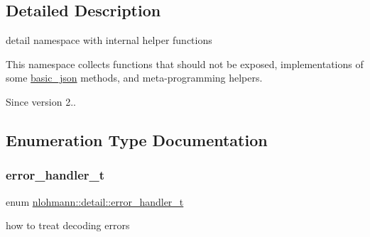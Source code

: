 \subsection{Detailed Description}
detail namespace with internal helper functions 

This namespace collects functions that should not be exposed, implementations of some \hyperlink{classnlohmann_1_1basic__json}{basic\+\_\+json} methods, and meta-\/programming helpers.

\begin{DoxySince}{Since}
version 2.. 
\end{DoxySince}


\subsection{Enumeration Type Documentation}
\mbox{\label{namespacenlohmann_1_1detail_a5a76b60b26dc8c47256a996d18d967df}} 
\subsubsection{\texorpdfstring{error\+\_\+handler\+\_\+t}{error\_handler\_t}}
{\footnotesize\ttfamily enum \hyperlink{namespacenlohmann_1_1detail_a5a76b60b26dc8c47256a996d18d967df}{nlohmann\+::detail\+::error\+\_\+handler\+\_\+t}\hspace{0.3cm}{\ttfamily [strong]}}



how to treat decoding errors 

